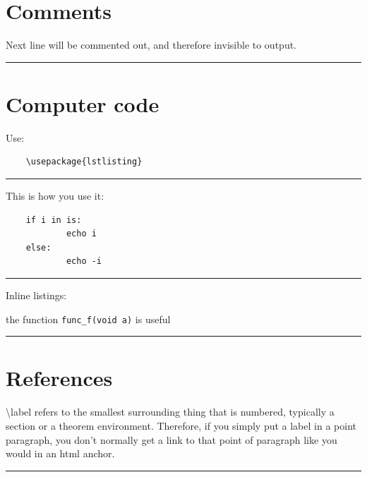 \documentclass[12pt]{article}
\newcommand{\inOut}[1]{#1}                                %
\begin{document}
\section{Comments}\label{secCom}

    \begin{example} \label{expCom1}
            Next line will be commented out, and therefore invisible to output.

    \end{example}\hrule

\section{Computer code}\label{secCode}

    \begin{remark} \label{remCode1}
        Use:
        \begin{lstlisting}
    \usepackage{lstlisting}
        \end{lstlisting}
    \end{remark}\hrule

    \begin{example} \label{expLst1}
        This is how you use it:
            \begin{lstlisting}
    if i in is:
            echo i
    else:
            echo -i
            \end{lstlisting}
    \end{example}\hrule

    \begin{example} \label{expLst2}
        Inline listings:

            the function \lstinline|func_f(void a)| is useful
    \end{example}\hrule

    \section{References}\label{secRef}

    \begin{remark} \label{remLab1}
        \textbackslash{}label refers to the smallest surrounding thing that is numbered, typically a section or a theorem environment. Therefore, if you simply put a label in a point paragraph, you don't normally get a link to that point of paragraph like you would in an html anchor.
    \end{remark}\hrule
\end{document}
